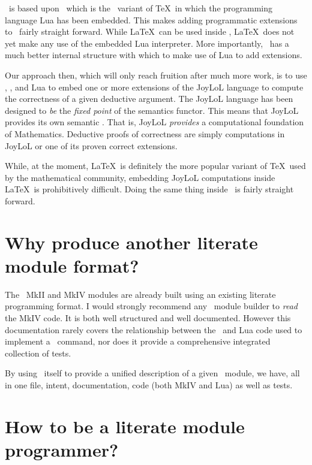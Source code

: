 \ConTeXt\ is based upon \LuaTeX\ which is the \pdfTeX\ variant of \TeX\ in 
which the programming language Lua has been embedded. This makes adding 
programmatic extensions to \ConTeXt\ fairly straight forward. While \LaTeX\ 
can be used inside \LuaTeX, \LaTeX\ does not yet make any use of the 
embedded Lua interpreter. More importantly, \ConTeXt\, has a much better 
internal structure with which to make use of Lua to add extensions. 

Our approach then, which will only reach fruition after much more work, is 
to use \ConTeXt, \LuaTeX, and Lua to embed one or more extensions of the 
JoyLoL language to compute the correctness of a given deductive argument. 
The JoyLoL language has been designed to \emph{be} the \emph{fixed point} 
of the semantics functor. This means that JoyLoL provides its own semantic 
\quote{meaning}. That is, JoyLoL \emph{provides} a computational 
foundation of Mathematics. Deductive proofs of correctness are simply 
computations in JoyLoL or one of its proven correct extensions. 

While, at the moment, \LaTeX\ is definitely the more popular variant of 
\TeX\ used by the mathematical community, embedding JoyLoL computations 
inside \LaTeX\ is prohibitively difficult. Doing the same thing inside 
\ConTeXt\ is fairly straight forward. 

\section{Why produce another literate module format?} 

The \ConTeXt\ MkII and MkIV modules are already built using an existing 
literate programming format. I would strongly recommend any \ConTeXt\ 
module builder to \emph{read} the MkIV code. It is both well structured 
and well documented. However this documentation rarely covers the 
relationship between the \LuaTeX\ and Lua code used to implement a 
\ConTeXt\ command, nor does it provide a comprehensive integrated 
collection of tests. 

By using \ConTeXt\ itself to provide a unified description of a given 
\ConTeXt\ module, we have, all in one file, intent, documentation, code 
(both MkIV and Lua) as well as tests. 

\section{How to be a literate module programmer?} 

